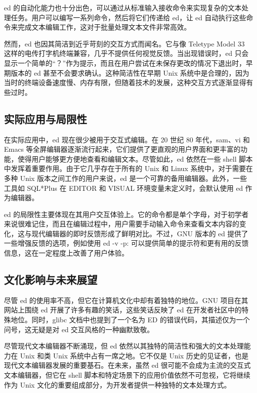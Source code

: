 ed 的自动化能力也十分出色，可以通过从标准输入接收命令来实现复杂的文本处理任务。用户可以编写一系列命令，然后将它们传递给 ed，让 ed 自动执行这些命令来完成文本编辑工作，这对于批量处理文本文件非常高效。

然而，ed 也因其简洁到近乎苛刻的交互方式而闻名。它与像 Teletype Model 33 这样的电传打字机终端兼容，几乎不提供任何视觉反馈。当出现错误时，ed 只会显示一个简单的“？”作为提示，而且在用户尝试在未保存更改的情况下退出时，早期版本的 ed 甚至不会要求确认。这种简洁性在早期 Unix 系统中是合理的，因为当时的终端设备速度慢、内存有限，但随着技术的发展，这种交互方式逐渐显得有些过时。

\subsection{实际应用与局限性}

在实际应用中，ed 现在很少被用于交互式编辑。在 20 世纪 80 年代，sam、vi 和 Emacs 等全屏编辑器逐渐流行起来，它们提供了更直观的用户界面和更丰富的功能，使得用户能够更方便地查看和编辑文本。尽管如此，ed 依然在一些 shell 脚本中发挥着重要作用。由于它几乎存在于所有的 Unix 和 Linux 系统中，对于需要在多种 Unix 版本之间工作的用户来说，ed 是一个可靠的备用编辑器。此外，一些工具如 SQL*Plus 在 EDITOR 和 VISUAL 环境变量未定义时，会默认使用 ed 作为编辑器。

ed 的局限性主要体现在其用户交互体验上。它的命令都是单个字母，对于初学者来说很难记住，而且在编辑过程中，用户需要手动输入命令来查看文本内容的变化，这与现代编辑器的即时反馈形成了鲜明对比。不过，GNU 版本的 ed 提供了一些增强反馈的选项，例如使用 ed -v -p: 可以提供简单的提示符和更有用的反馈信息，这在一定程度上改善了用户体验。

\subsection{文化影响与未来展望}

尽管 ed 的使用率不高，但它在计算机文化中却有着独特的地位。GNU 项目在其网站上围绕 ed 开展了许多有趣的笑话，这些笑话反映了 ed 在开发者社区中的特殊地位。同时，glibc 文档中也提到了一个名为 ED 的错误代码，其描述仅为一个问号，这无疑是对 ed 交互风格的一种幽默致敬。

尽管现代文本编辑器不断涌现，但 ed 依然以其独特的简洁性和强大的文本处理能力在 Unix 和类 Unix 系统中占有一席之地。它不仅是 Unix 历史的见证者，也是现代文本编辑器发展的重要基石。在未来，虽然 ed 很可能不会成为主流的交互式文本编辑器，但它在 shell 脚本和特定场景下的应用价值依然不可忽视，它将继续作为 Unix 文化的重要组成部分，为开发者提供一种独特的文本处理方式。

